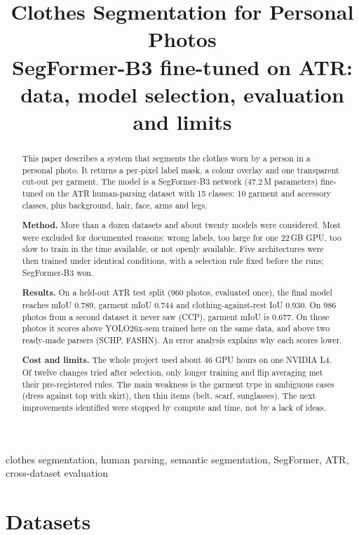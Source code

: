 \documentclass[conference,a4paper]{IEEEtran}
\title{Clothes Segmentation for Personal Photos\\[2pt]
{\large SegFormer-B3 fine-tuned on ATR: data, model selection, evaluation and limits}}
\author{\IEEEauthorblockN{Eyad Elnakib}}
\begin{document}
\maketitle

\begin{abstract}
\noindent This paper describes a system that segments the clothes worn by a person in a personal photo. It returns a per-pixel label mask, a colour overlay and one transparent cut-out per garment. The model is a SegFormer-B3 network (47.2\,M parameters) fine-tuned on the ATR human-parsing dataset with 15 classes: 10 garment and accessory classes, plus background, hair, face, arms and legs.

\noindent\textbf{Method.} More than a dozen datasets and about twenty models were considered. Most were excluded for documented reasons: wrong labels, too large for one 22\,GB GPU, too slow to train in the time available, or not openly available. Five architectures were then trained under identical conditions, with a selection rule fixed before the runs; SegFormer-B3 won.

\noindent\textbf{Results.} On a held-out ATR test split (960 photos, evaluated once), the final model reaches mIoU 0.789, garment mIoU 0.744 and clothing-against-rest IoU 0.930. On 986 photos from a second dataset it never saw (CCP), garment mIoU is 0.677. On those photos it scores above YOLO26x-sem trained here on the same data, and above two ready-made parsers (SCHP, FASHN). An error analysis explains why each scores lower.

\noindent\textbf{Cost and limits.} The whole project used about 46 GPU hours on one NVIDIA L4. Of twelve changes tried after selection, only longer training and flip averaging met their pre-registered rules. The main weakness is the garment type in ambiguous cases (dress against top with skirt), then thin items (belt, scarf, sunglasses). The next improvements identified were stopped by compute and time, not by a lack of ideas.
\end{abstract}

\begin{IEEEkeywords}
clothes segmentation, human parsing, semantic segmentation, SegFormer, ATR, cross-dataset evaluation
\end{IEEEkeywords}


\section{Datasets}
\label{sec:data}
\end{document}
